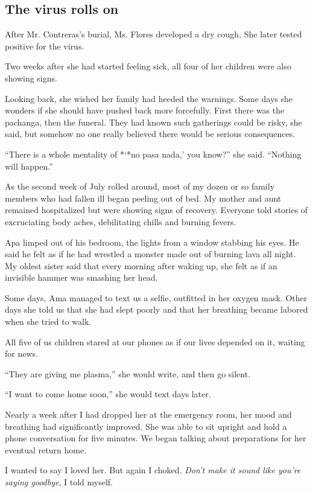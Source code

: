 \hypertarget{the-virus-rolls-on}{%
\subsection{The virus rolls on}\label{the-virus-rolls-on}}

After Mr. Contreras's burial, Ms. Flores developed a dry cough. She
later tested positive for the virus.

Two weeks after she had started feeling sick, all four of her children
were also showing signs.

Looking back, she wished her family had heeded the warnings. Some days
she wonders if she should have pushed back more forcefully. First there
was the pachanga, then the funeral. They had known such gatherings could
be risky, she said, but somehow no one really believed there would be
serious consequences.

``There is a whole mentality of *`*no pasa nada,' you know?'' she said.
``Nothing will happen.''

As the second week of July rolled around, most of my dozen or so family
members who had fallen ill began peeling out of bed. My mother and aunt
remained hospitalized but were showing signs of recovery. Everyone told
stories of excruciating body aches, debilitating chills and burning
fevers.

Apa limped out of his bedroom, the lights from a window stabbing his
eyes. He said he felt as if he had wrestled a monster made out of
burning lava all night. My oldest sister said that every morning after
waking up, she felt as if an invisible hammer was smashing her head.

Some days, Ama managed to text us a selfie, outfitted in her oxygen
mask. Other days she told us that she had slept poorly and that her
breathing became labored when she tried to walk.

All five of us children stared at our phones as if our lives depended on
it, waiting for news.

``They are giving me plasma,'' she would write, and then go silent.

``I want to come home soon,'' she would text days later.

Nearly a week after I had dropped her at the emergency room, her mood
and breathing had significantly improved. She was able to sit upright
and hold a phone conversation for five minutes. We began talking about
preparations for her eventual return home.

I wanted to say I loved her. But again I choked. \emph{Don't make it
sound like you're} \emph{saying goodbye}, I told myself.

